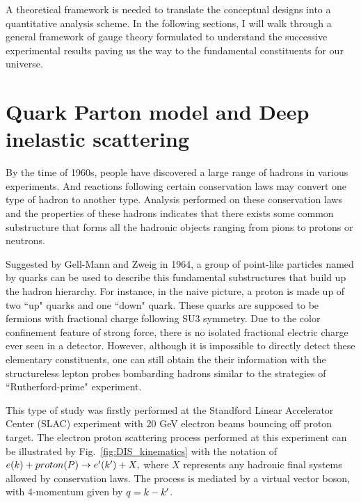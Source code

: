 %


A theoretical framework is needed to translate the conceptual designs into a
quantitative analysis scheme. In the following sections, I will walk
through a general framework of gauge theory formulated to understand the
successive experimental results paving us the way to the fundamental constituents for our
universe.



\section{Quark Parton model and Deep inelastic scattering}\label{sec:basicQCD}
By the time of 1960s, people have discovered a large range of hadrons 
in various experiments. And reactions following certain conservation laws
may convert one type of hadron to another type. Analysis performed on these 
conservation laws and the properties of these hadrons indicates that
there exists some common substructure that forms all the hadronic objects ranging
from pions to protons or neutrons.


Suggested by Gell-Mann and Zweig in 1964, a group of point-like
particles named by quarks 
can be used to describe this fundamental substructures that build up the hadron hierarchy. 
For instance, in the naive picture, a proton is made up of two ``up" quarks and one ``down" quark. 
These quarks are supposed to be fermions with fractional charge following SU3 symmetry. Due to the color confinement feature of strong force, there is no isolated fractional electric
charge ever seen in a detector. However, although it is impossible to directly detect these elementary
constituents, one can still obtain the their information with the
structureless lepton probes bombarding hadrons similar to the strategies of ``Rutherford-prime" experiment.

This type of study was firstly performed at the Standford Linear Accelerator Center (SLAC) experiment with 20 GeV electron beams
bouncing off proton target. 
The electron proton scattering process performed at this experiment can be
illustrated by Fig.~\ref{fig:DIS_kinematics} with the notation of
\( e(k)+proton(P) \rightarrow e^{\prime}(k^{\prime}) + X, \)
where $X$ represents any hadronic final systems allowed by conservation laws.
The process is mediated by a virtual vector boson, with 4-momentum given by $q=k-k^{\prime}$.

